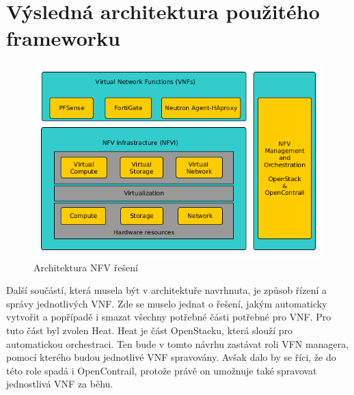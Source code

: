 \section{Výsledná architektura použitého frameworku}



\begin{figure}[h]
\begin{centering}
\includegraphics[scale=0.51]{images/VNF_overview}
\par\end{centering}
\caption{Architektura NFV řešení\label{fig:VNF_overview}}
\end{figure}

Další součástí, která musela být v architektuře navrhnuta, je způsob řízení a správy jednotlivých VNF. Zde se muselo jednat o řešení, jakým automaticky vytvořit a popřípadě i smazat všechny potřebné části potřebné pro VNF. Pro tuto část byl zvolen Heat. Heat je část OpenStacku, která slouží pro automatickou orchestraci. Ten bude v tomto návrhu zastávat roli VFN managera, pomocí kterého budou jednotlivé VNF spravovány. Avšak dalo by se říci, že do této role spadá i OpenContrail, protože právě on umožnuje také spravovat jednostlivá VNF za běhu.  

